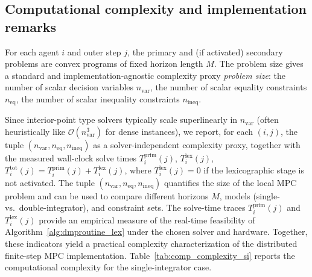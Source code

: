 \documentclass[12pt,draftcls,onecolumn]{IEEEtran}
\begin{document}
\subsection{Computational complexity and implementation remarks}


For each agent $i$ and outer step $j$, the primary and (if activated) secondary problems are convex programs of fixed horizon length $M$. 
The problem size gives a standard and implementation-agnostic complexity proxy \emph{problem size}:
the number of scalar decision variables $n_{\mathrm{var}}$, the number of scalar equality constraints $n_{\mathrm{eq}}$, the number of scalar inequality constraints $n_{\mathrm{ineq}}$.

Since interior-point type solvers typically scale superlinearly in $n_{\mathrm{var}}$ (often heuristically like $\mathcal O(n_{\mathrm{var}}^3)$ for dense instances), we report, for each $(i,j)$, the tuple
$(n_{\mathrm{var}},n_{\mathrm{eq}},n_{\mathrm{ineq}})$
as a solver-independent complexity proxy, together with the measured wall-clock solve times
$T^{\mathrm{prim}}_{i}(j)$, $T^{\mathrm{lex}}_{i}(j)$,
$T^{\mathrm{tot}}_{i}(j)=T^{\mathrm{prim}}_{i}(j)+T^{\mathrm{lex}}_{i}(j)$,
where $T^{\mathrm{lex}}_{i}(j)=0$ if the lexicographic stage is not activated.
The tuple $(n_{\mathrm{var}},n_{\mathrm{eq}},n_{\mathrm{ineq}})$ quantifies the size of the local MPC problem and can be used to compare different horizons $M$, models (single- vs.\ double-integrator), and constraint sets. The solve-time traces $T^{\mathrm{prim}}_{i}(j)$ and $T^{\mathrm{lex}}_{i}(j)$ provide an empirical measure of the real-time feasibility of Algorithm~\ref{alg:dmproutine_lex} under the chosen solver and hardware.
Together, these indicators yield a practical complexity characterization of the distributed finite-step MPC implementation.
Table~\ref{tab:comp_complexity_si} reports the computational complexity for the single-integrator case.
\end{document}

